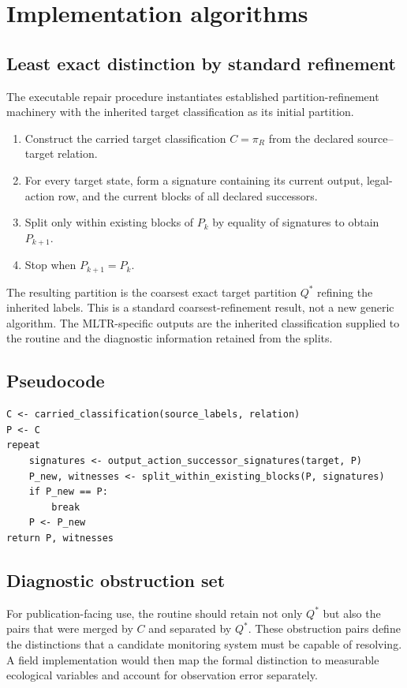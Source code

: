 \section{Implementation algorithms}

\subsection{Least exact distinction by standard refinement}
The executable repair procedure instantiates established partition-refinement machinery with the inherited target classification as its initial partition.

\begin{enumerate}
\item Construct the carried target classification $C=\pi_R$ from the declared source--target relation.
\item For every target state, form a signature containing its current output, legal-action row, and the current blocks of all declared successors.
\item Split only within existing blocks of $P_k$ by equality of signatures to obtain $P_{k+1}$.
\item Stop when $P_{k+1}=P_k$.
\end{enumerate}

The resulting partition is the coarsest exact target partition $Q^\ast$ refining the inherited labels. This is a standard coarsest-refinement result, not a new generic algorithm. The MLTR-specific outputs are the inherited classification supplied to the routine and the diagnostic information retained from the splits.

\subsection{Pseudocode}
\begin{verbatim}
C <- carried_classification(source_labels, relation)
P <- C
repeat
    signatures <- output_action_successor_signatures(target, P)
    P_new, witnesses <- split_within_existing_blocks(P, signatures)
    if P_new == P:
        break
    P <- P_new
return P, witnesses
\end{verbatim}

\subsection{Diagnostic obstruction set}
For publication-facing use, the routine should retain not only $Q^\ast$ but also the pairs that were merged by $C$ and separated by $Q^\ast$. These obstruction pairs define the distinctions that a candidate monitoring system must be capable of resolving. A field implementation would then map the formal distinction to measurable ecological variables and account for observation error separately.

